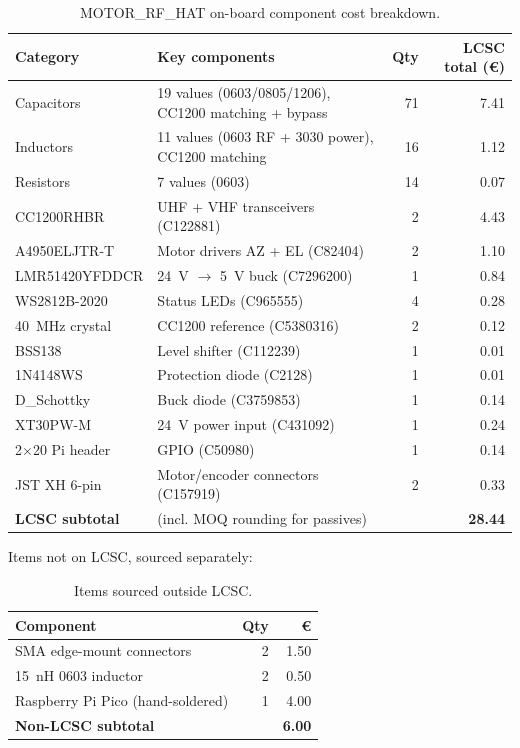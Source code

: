 \begin{table}[H]
    \centering
    \begin{tabularx}{\textwidth}{lXrr}
        \toprule
        Category & Key components & Qty & LCSC total (\euro{}) \\
        \midrule
        Capacitors & 19 values (0603/0805/1206), CC1200 matching + bypass & 71 & 7.41 \\
        Inductors & 11 values (0603 RF + 3030 power), CC1200 matching & 16 & 1.12 \\
        Resistors & 7 values (0603) & 14 & 0.07 \\
        CC1200RHBR & UHF + VHF transceivers (C122881) & 2 & 4.43 \\
        A4950ELJTR-T & Motor drivers AZ + EL (C82404) & 2 & 1.10 \\
        LMR51420YFDDCR & 24~V $\to$ 5~V buck (C7296200) & 1 & 0.84 \\
        WS2812B-2020 & Status LEDs (C965555) & 4 & 0.28 \\
        40~MHz crystal & CC1200 reference (C5380316) & 2 & 0.12 \\
        BSS138 & Level shifter (C112239) & 1 & 0.01 \\
        1N4148WS & Protection diode (C2128) & 1 & 0.01 \\
        D\_Schottky & Buck diode (C3759853) & 1 & 0.14 \\
        XT30PW-M & 24~V power input (C431092) & 1 & 0.24 \\
        2$\times$20 Pi header & GPIO (C50980) & 1 & 0.14 \\
        JST XH 6-pin & Motor/encoder connectors (C157919) & 2 & 0.33 \\
        \midrule
        \textbf{LCSC subtotal} & (incl. MOQ rounding for passives) & & \textbf{28.44} \\
        \bottomrule
    \end{tabularx}
    \caption{MOTOR\_RF\_HAT on-board component cost breakdown.}
    \label{tab:bom-onboard}
\end{table}

Items not on LCSC, sourced separately:

\begin{table}[H]
    \centering
    \begin{tabular}{lrr}
        \toprule
        Component & Qty & \euro{} \\
        \midrule
        SMA edge-mount connectors & 2 & 1.50 \\
        15~nH 0603 inductor & 2 & 0.50 \\
        Raspberry Pi Pico (hand-soldered) & 1 & 4.00 \\
        \midrule
        \textbf{Non-LCSC subtotal} & & \textbf{6.00} \\
        \bottomrule
    \end{tabular}
    \caption{Items sourced outside LCSC.}
    \label{tab:bom-non-lcsc}
\end{table}

